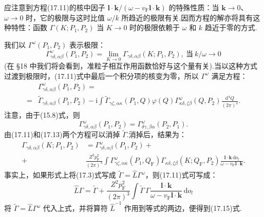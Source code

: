 应注意到方程(17.11)的核中因子 $\bm{l}\cdot\bm{k}/(\omega-v_{\mathrm{F}}\bm{l}\cdot\bm{k})$ 的特殊性质：当 $\bm{k}\to0$、$\omega\to0$ 时，它的极限与这时比值 $\omega/k$ 所趋近的极限有关.因而方程的解亦将具有这种特性：函数 $\Gamma(K;P_1,P_2)$ 当 $K\to0$ 时的极限依赖于 $\omega$ 和 $k$ 趋近于零的方式.

我们以 $\Gamma^{\omega}(P_1,P_2)$ 表示极限：
\begin{equation}
  \Gamma^{\omega}_{\gamma\delta,\alpha\beta}(P_1,P_2)=\lim_{K\to0}\Gamma_{\gamma\delta,\alpha\beta}(K;P_1,P_2),\ \text{当}\ k/\omega\to0
\end{equation}
(在 §18 中我们将会看到，准粒子相互作用函数恰好与这个量有关).当以这种方式过渡到极限时，(17.11)式中最后一个积分项的核变为零，所以 $\Gamma^{\omega}$ 满足方程：
\begin{equation}
\begin{aligned}
  &\Gamma^{\omega}_{\gamma\delta,\alpha\beta}(P_1,P_2)=\\
  ={}&\tilde{\Gamma}_{\gamma\delta,\alpha\beta}(P_1,P_2)-\mathrm{i}\int\tilde{\Gamma}_{\gamma\zeta,\alpha\kappa}(P_1,Q)\varphi(Q)\Gamma^{\omega}_{\kappa\delta,\zeta\beta}(Q,P_2)\frac{\mathrm{d}^4Q}{(2\pi)^4}.
\end{aligned}
\end{equation}
注意，由于(15.8)式，则
\begin{equation}
  \Gamma^{\omega}_{\gamma\delta,\alpha\beta}(P_1,P_2)=\Gamma^{\omega}_{\delta\gamma,\beta\alpha}(P_2,P_1).
\end{equation}
由(17.11)和(17.13)两个方程可以消掉 $\tilde{\Gamma}$.消掉后，结果为：
\begin{equation}
\begin{aligned}
  \Gamma_{\gamma\delta,\alpha\beta}(K;P_1,P_2)&=\Gamma^{\omega}_{\gamma\delta,\alpha\beta}(P_1,P_2)+\\
  +{}&\frac{Z^2p_{\mathrm{F}}^2}{(2\pi)^3}\int\Gamma^{\omega}_{\gamma\zeta,\alpha\kappa}(P_1,Q_{\mathrm{F}})\Gamma_{\kappa\delta,\zeta\beta}(K;Q_{\mathrm{F}},P_2)\frac{\bm{l}\cdot\bm{k}\,\mathrm{d}o_l}{\omega-v_{\mathrm{F}}\bm{l}\cdot\bm{k}}.
\end{aligned}
\end{equation}
事实上，如果形式上将(17.3)式写成 $\tilde{\Gamma}=\hat{L}\Gamma^{\omega}$，则(17.11)式可写成：
\begin{equation*}
  \hat{L}\Gamma=\tilde{\Gamma}+\frac{Z^2p_{\mathrm{F}}^2}{(2\pi)^3}\int\tilde{\Gamma}\,\Gamma\frac{\bm{l}\cdot\bm{k}}{\omega-v_{\mathrm{F}}\bm{l}\cdot\bm{k}}\,\mathrm{d}o_l
\end{equation*}
将 $\tilde{\Gamma}=\hat{L}\Gamma^{\omega}$ 代入上式，并将算符 $\hat{L}^{-1}$ 作用到等式的两边，便得到(17.15)式.

